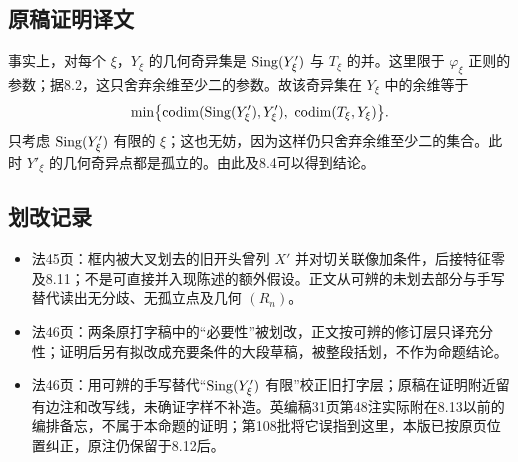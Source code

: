 \subsection*{原稿证明译文}
事实上，对每个 $\xi$，$Y_\xi$ 的几何奇异集是 $\operatorname{Sing}(Y'_\xi)$ 与 $T_\xi$ 的并。这里限于 $\varphi_\xi$ 正则的参数；据8.2，这只舍弃余维至少二的参数。故该奇异集在 $Y_\xi$ 中的余维等于
\[
 \min\bigl\{\operatorname{codim}(\operatorname{Sing}(Y'_\xi),Y'_\xi),
                   \ \operatorname{codim}(T_\xi,Y_\xi)\bigr\}.
\]
只考虑 $\operatorname{Sing}(Y'_\xi)$ 有限的 $\xi$；这也无妨，因为这样仍只舍弃余维至少二的集合。此时 $Y'_\xi$ 的几何奇异点都是孤立的。由此及8.4可以得到结论。

\subsection*{划改记录}
\begin{itemize}
\item 法45页：框内被大叉划去的旧开头曾列 $X'$ 并对切关联像加条件，后接特征零及8.11；不是可直接并入现陈述的额外假设。正文从可辨的未划去部分与手写替代读出无分歧、无孤立点及几何 $(R_n)$。
\item 法46页：两条原打字稿中的“必要性”被划改，正文按可辨的修订层只译充分性；证明后另有拟改成充要条件的大段草稿，被整段括划，不作为命题结论。
\item 法46页：用可辨的手写替代“$\operatorname{Sing}(Y'_\xi)$ 有限”校正旧打字层；原稿在证明附近留有边注和改写线，未确证字样不补造。英编稿31页第48注实际附在8.13以前的编排备忘，不属于本命题的证明；第108批将它误指到这里，本版已按原页位置纠正，原注仍保留于8.12后。
\end{itemize}
\endgroup
